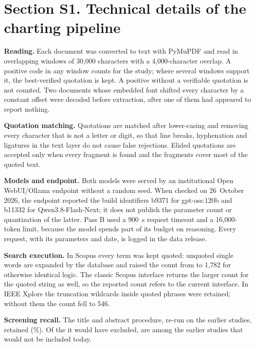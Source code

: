 \documentclass[10pt]{article}
\begin{document}
\section*{Section S1. Technical details of the charting pipeline}

\textbf{Reading.} Each document was converted to text with PyMuPDF and read
in overlapping windows of 30{,}000 characters with a 4{,}000-character
overlap. A positive code in any window counts for the study; where several
windows support it, the best-verified quotation is kept. A positive without
a verifiable quotation is not counted. Two documents whose embedded font
shifted every character by a constant offset were decoded before
extraction, after one of them had appeared to report nothing.

\textbf{Quotation matching.} Quotations are matched after lower-casing and
removing every character that is not a letter or digit, so that line breaks,
hyphenation and ligatures in the text layer do not cause false rejections.
Elided quotations are accepted only when every fragment is found and the
fragments cover most of the quoted text.

\textbf{Models and endpoint.} Both models were served by an institutional
Open WebUI/Ollama endpoint without a random seed. When checked on
26~October 2026, the endpoint reported the build identifiers b9371 for
gpt-oss:120b and b11332 for Qwen3.8-Flash-Next; it does not publish the
parameter count or quantization of the latter. Pass B used a 900~s request
timeout and a 16{,}000-token limit, because the model spends part of its
budget on reasoning. Every request, with its parameters and date, is logged
in the data release.

\textbf{Search execution.} In Scopus every term was kept quoted: unquoted
single words are expanded by the database and raised the count from
\NidScopus{} to 1{,}782 for otherwise identical logic. The classic Scopus
interface returns the larger count for the quoted string as well, so the
reported count refers to the current interface. In IEEE Xplore the
truncation wildcards inside quoted phrases were retained; without them the
count fell to 546.

\textbf{Screening recall.} The title and abstract procedure, re-run on the
\RecallN{} earlier studies, retained \RecallKept{} (\RecallPct\%). Of the
\RecallLost{} it would have excluded, \RecallLostFlagged{} are among the
earlier studies that would not be included today.
\end{document}
